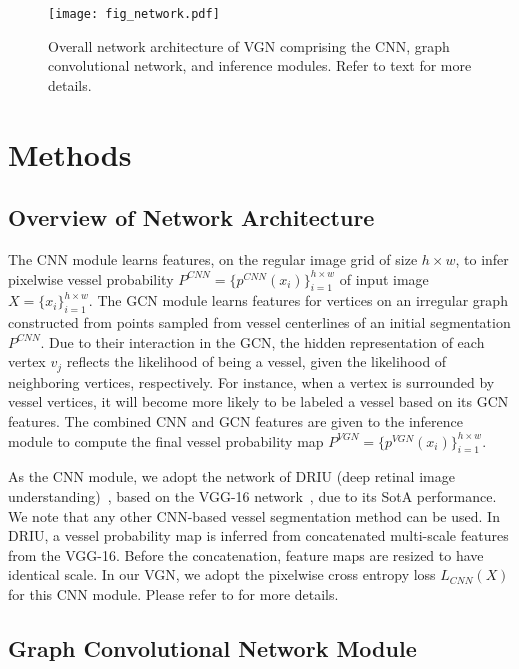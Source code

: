 \documentclass[runningheads,a4paper]{llncs}
\begin{document}
\begin{figure}
	\centering
	\texttt{[image: fig\_network.pdf]}
	\caption{Overall network architecture of VGN comprising the CNN, graph convolutional network, and inference modules. Refer to text for more details.}
	\label{fig:network}
\end{figure}

\section{Methods}

\subsection{Overview of Network Architecture}\label{architecture}

The CNN module learns features, on the regular image grid of size $h \times w$, to infer pixelwise vessel probability $P^{CNN}=\{p^{CNN}(x_{i})\}^{h \times w}_{i=1}$ of input image $X=\{x_{i}\}^{h \times w}_{i=1}$. The GCN module learns features for vertices on an irregular graph constructed from points sampled from vessel centerlines of an initial segmentation $P^{CNN}$. Due to their interaction in the GCN, the hidden representation of each vertex $v_{j}$ reflects the likelihood of being a vessel, given the likelihood of neighboring vertices, respectively. For instance, when a vertex is surrounded by vessel vertices, it will become more likely to be labeled a vessel based on its GCN features. The combined CNN and GCN features are given to the inference module to compute the final vessel probability map $P^{VGN}=\{p^{VGN}(x_{i})\}^{h \times w}_{i=1}$.

As the CNN module, we adopt the network of DRIU (deep retinal image understanding)~\cite{maninis16}, based on the VGG-16 network~\cite{simonyan14}, due to its SotA performance. We note that any other CNN-based vessel segmentation method can be used. In DRIU, a vessel probability map is inferred from concatenated multi-scale features from the VGG-16. Before the concatenation, feature maps are resized to have identical scale. In our VGN, we adopt the pixelwise cross entropy loss $L_{CNN}(X)$ for this CNN module. Please refer to \cite{maninis16} for more details.

\subsection{Graph Convolutional Network Module}\label{gcn_module}
\end{document}
